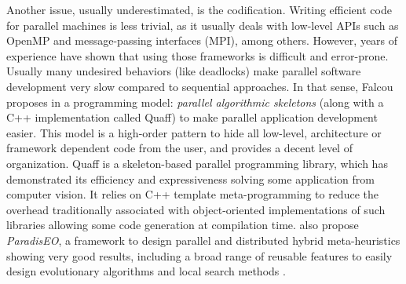 
Another issue, usually underestimated, is the codification. Writing efficient code for parallel machines is less trivial, as it usually deals with low-level APIs such as OpenMP and message-passing interfaces (MPI), among others. However, years of experience have shown that using those frameworks is difficult and error-prone. Usually many undesired behaviors (like deadlocks) make parallel software development very slow compared to sequential approaches. In that sense, Falcou proposes in \cite{Falcou2009} a programming model: \textit{parallel algorithmic skeletons} (along with a C++ implementation called {\sc Quaff}) to make parallel application development easier. This model is a high-order pattern to hide all low-level, architecture or framework dependent code from the user, and provides a decent level of organization. {\sc Quaff} is a skeleton-based parallel programming library, which has demonstrated its efficiency and expressiveness solving some application from computer vision. It relies on C++ template meta-programming to reduce the overhead traditionally associated with object-oriented implementations of such libraries allowing some code generation at compilation time.  also propose {\it ParadisEO}, a framework to design parallel and distributed hybrid meta-heuristics showing very good results, including a broad range of reusable features to easily design evolutionary algorithms and local search methods \cite{Cahon2004}.


